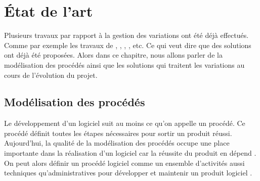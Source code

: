 \chapter{État de l'art} %

\label{Chapitre2} %

Plusieurs travaux par rapport à la gestion des variations ont été déjà effectués. Comme par exemple les travaux de \cite{sacl}, \cite{alm}, \cite{kabaaj}, \cite{gc}, etc. Ce qui veut dire que des solutions ont déjà été proposées. Alors dans ce chapitre, nous allons parler de la modélisation des procédés ainsi que les solutions qui traitent les variations au cours de l'évolution du projet.\\
\section{Modélisation des procédés}
Le développement d'un logiciel suit au moins ce qu'on appelle un procédé.  Ce procédé définit toutes les étapes nécessaires pour sortir un produit réussi. Aujourd'hui, la qualité de la modélisation des procédés occupe une place importante dans la réalisation d'un logiciel car la réussite du produit en dépend \cite{wsh73} \cite{abgm}.\\
On peut alors définir un procédé logiciel comme un ensemble d'activités aussi techniques qu'administratives pour développer et maintenir un produit logiciel \cite{jl}.\\
